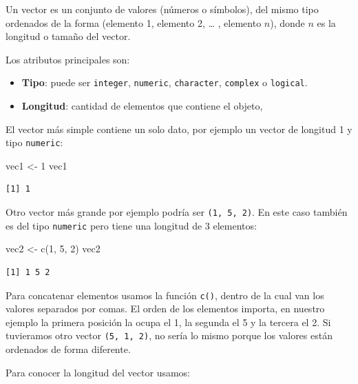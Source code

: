 \documentclass[
  spanish,
  letterpaper,
  DIV=11,
  numbers=noendperiod]{scrreprt}
\newenvironment{Shaded}{\begin{snugshade}}{\end{snugshade}}
\newcommand{\DecValTok}[1]{\textcolor[rgb]{0.68,0.00,0.00}{#1}}
\newcommand{\FunctionTok}[1]{\textcolor[rgb]{0.28,0.35,0.67}{#1}}
\newcommand{\NormalTok}[1]{\textcolor[rgb]{0.00,0.23,0.31}{#1}}
\newcommand{\OtherTok}[1]{\textcolor[rgb]{0.00,0.23,0.31}{#1}}
\begin{document}
Un vector es un conjunto de valores (números o símbolos), del mismo tipo
ordenados de la forma (elemento 1, elemento 2, \ldots{} , elemento
\(n\)), donde \(n\) es la longitud o tamaño del vector.

Los atributos principales son:

\begin{itemize}
\item
  \textbf{Tipo}: puede ser \texttt{integer}, \texttt{numeric},
  \texttt{character}, \texttt{complex} o \texttt{logical}.
\item
  \textbf{Longitud}: cantidad de elementos que contiene el objeto,
\end{itemize}

El vector más simple contiene un solo dato, por ejemplo un vector de
longitud 1 y tipo \texttt{numeric}:

\begin{Shaded}
\begin{Highlighting}[]
\NormalTok{vec1 }\OtherTok{\textless{}{-}} \DecValTok{1}
\NormalTok{vec1}
\end{Highlighting}
\end{Shaded}

\begin{verbatim}
[1] 1
\end{verbatim}

Otro vector más grande por ejemplo podría ser \texttt{(1,\ 5,\ 2)}. En
este caso también es del tipo \texttt{numeric} pero tiene una longitud
de 3 elementos:

\begin{Shaded}
\begin{Highlighting}[]
\NormalTok{vec2 }\OtherTok{\textless{}{-}} \FunctionTok{c}\NormalTok{(}\DecValTok{1}\NormalTok{, }\DecValTok{5}\NormalTok{, }\DecValTok{2}\NormalTok{)}
\NormalTok{vec2}
\end{Highlighting}
\end{Shaded}

\begin{verbatim}
[1] 1 5 2
\end{verbatim}

Para concatenar elementos usamos la función \texttt{c()}, dentro de la
cual van los valores separados por comas. El orden de los elementos
importa, en nuestro ejemplo la primera posición la ocupa el 1, la
segunda el 5 y la tercera el 2. Si tuvieramos otro vector
\texttt{(5,\ 1,\ 2)}, no sería lo mismo porque los valores están
ordenados de forma diferente.

Para conocer la longitud del vector usamos:
\end{document}
